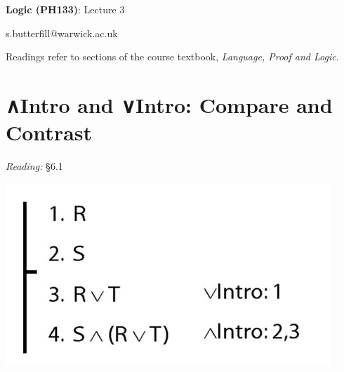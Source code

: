 \documentclass[12pt]{extarticle}
\date{}
\makeatletter
\def \ititle {Origins of Mind}
\def \isubtitle {Lecture 08}
\def \iemail{s.butterfill@warwick.ac.uk}
\makeatother
\begin{document}

\begin{multicols*}{3}

\setlength\footnotesep{1em}







\def \ititle {Logic (PH133)}
 
\def \isubtitle {Lecture 3}
 
\begin{center}
 
{\Large
 
\textbf{\ititle}: \isubtitle
 
}
 
 
 
\iemail %
 
\end{center}
 
Readings refer to sections of the course textbook, \emph{Language, Proof and Logic}.
 
 
 
\section{∧Intro and ∨Intro: Compare and Contrast}
 
\emph{Reading:} §6.1
 
\begin{center}
\includegraphics[scale=0.3]{img/proof_unit_212}
\end{center}
\begin{minipage}{\columnwidth}
 

\end{minipage}
\end{multicols*}
\end{document}
